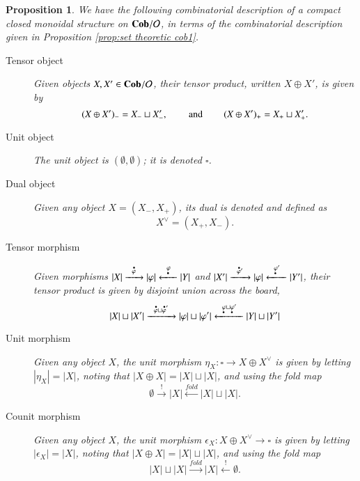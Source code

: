 \documentclass{amsart}
\def\tn{\textnormal}
\def\mc{\mathcal}
\def\hsp{\hspace{.3in}}
\def\to{\rightarrow}
\def\taking{\colon}
\newcommand{\To}[1]{\xrightarrow{#1}}
\newcommand{\Too}[1]{\xrightarrow{\ \ #1\ \ }}
\newcommand{\From}[1]{\xleftarrow{#1}}
\newcommand{\Fromm}[1]{\xleftarrow{\ \ #1\ \ }}
\def\Cob{{\bf Cob}}
\def\mcO{\mc{O}}
\newcommand{\inp}[1]{{#1_-}}
\newcommand{\outp}[1]{{#1_+}}
\newcommand{\domn}[1]{{\accentset{\bullet}{#1}}}
\newcommand{\codomn}[1]{{\underaccent{\bullet}{#1}}}
\newtheorem{proposition}[subsection]{Proposition}
\theoremstyle{remark}
\theoremstyle{definition}
\begin{document}
\begin{proposition}

We have the following combinatorial description of a compact closed monoidal structure on $\Cob/\mcO$, in terms of the combinatorial description given in Proposition \ref{prop:set theoretic cob1}.
\begin{description}
\item [Tensor object] Given objects $X,X'\in\Cob/\mcO$, their tensor product, written $X\oplus X'$, is given by 
$$\inp{(X\oplus X')}=\inp{X}\sqcup\inp{X'}, \hsp\tn{and}\hsp \outp{(X\oplus X')}=\outp{X}\sqcup\outp{X'}.$$
\item [Unit object] The unit object is $(\emptyset,\emptyset)$; it is denoted $\square$.
\item [Dual object] Given any object $X=(\inp{X},\outp{X})$, its dual is denoted and defined as 
$$X^\vee=(\outp{X},\inp{X}).$$
\item [Tensor morphism] Given morphisms $|X|\Too{\domn{\varphi}}|\varphi|\Fromm{\codomn{\varphi}}|Y|$ and $|X'|\Too{\domn{\varphi}\hspace{0pt}'}|\varphi|\Fromm{\codomn{\varphi}'}|Y'|$, their tensor product is given by disjoint union across the board,
$$|X|\sqcup|X'|\Too{\domn{\varphi}\sqcup\domn{\varphi}'}|\varphi|\sqcup|\varphi'|\Fromm{\codomn{\varphi}\sqcup\codomn{\varphi}\hspace{0in}'}|Y|\sqcup|Y'|$$
\item [Unit morphism] Given any object $X$, the unit morphism $\eta_X\taking\square\to X\oplus X^\vee$ is given by letting $|\eta_X|=|X|$, noting that $|X\oplus X|=|X|\sqcup|X|$, and using the fold map 
$$\emptyset\To{!}|X|\From{fold}|X|\sqcup|X|.$$
\item [Counit morphism] Given any object $X$, the unit morphism $\epsilon_X\taking X\oplus X^\vee\to\square$ is given by letting $|\epsilon_X|=|X|$, noting that $|X\oplus X|=|X|\sqcup|X|$, and using the fold map 
$$|X|\sqcup|X|\To{fold}|X|\From{!}\emptyset.$$

\end{description}

\end{proposition}
\end{document}
